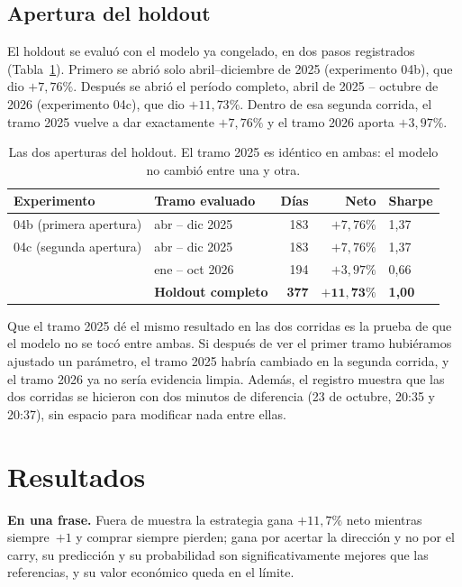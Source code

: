\documentclass[10pt,a4paper]{article}
\begin{document}
\subsection{Apertura del holdout}\label{sec:apertura}

El holdout se evaluó con el modelo ya congelado, en dos pasos registrados
(Tabla~\ref{tab:apertura}). Primero se abrió solo abril--diciembre de 2025
(experimento 04b), que dio $+7{,}76\%$. Después se abrió el período completo, abril de
2025 -- octubre de 2026 (experimento 04c), que dio $+11{,}73\%$. Dentro de esa segunda
corrida, el tramo 2025 vuelve a dar exactamente $+7{,}76\%$ y el tramo 2026 aporta
$+3{,}97\%$.

\begin{table}[htb]\centering\small
\begin{tabular}{@{}llrrl@{}}
\toprule
Experimento & Tramo evaluado & Días & Neto & Sharpe \\
\midrule
04b (primera apertura) & abr -- dic 2025        & 183 & $+7{,}76\%$  & 1,37 \\
\addlinespace
04c (segunda apertura) & abr -- dic 2025        & 183 & $+7{,}76\%$  & 1,37 \\
                       & ene -- oct 2026        & 194 & $+3{,}97\%$  & 0,66 \\
                       & \textbf{Holdout completo} & \textbf{377} & $\mathbf{+11{,}73\%}$ & \textbf{1,00} \\
\bottomrule
\end{tabular}
\caption{Las dos aperturas del holdout. El tramo 2025 es idéntico en ambas: el modelo no
cambió entre una y otra.}\label{tab:apertura}
\end{table}

Que el tramo 2025 dé el mismo resultado en las dos corridas es la prueba de que el
modelo no se tocó entre ambas. Si después de ver el primer tramo hubiéramos ajustado un
parámetro, el tramo 2025 habría cambiado en la segunda corrida, y el tramo 2026 ya no
sería evidencia limpia. Además, el registro muestra que las dos corridas se hicieron con
dos minutos de diferencia (23 de octubre, 20:35 y 20:37), sin espacio para modificar
nada entre ellas.

\section{Resultados}\label{sec:resultados}

\begin{ideaclave}
\textbf{En una frase.} Fuera de muestra la estrategia gana $+11{,}7\%$ neto mientras siempre~$+1$
y comprar siempre pierden; gana por acertar la dirección y no por el carry, su
predicción y su probabilidad son significativamente mejores que las referencias, y su
valor económico queda en el límite.
\end{ideaclave}
\end{document}
